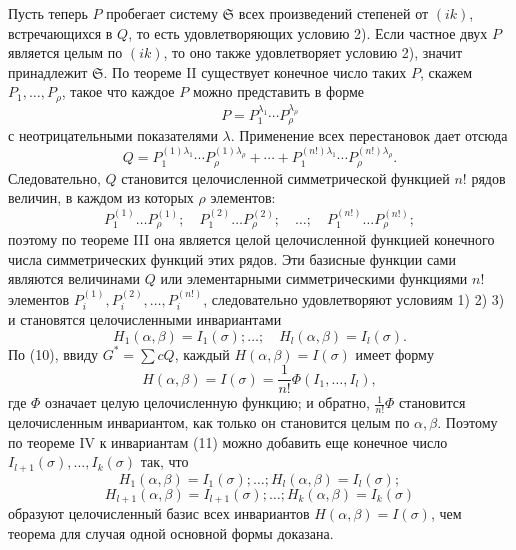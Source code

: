 \documentclass[11pt]{article}
\providecommand{\frS}{\mathfrak S}
\begin{document}
Пусть теперь \(P\) пробегает систему \(\frS\) всех произведений степеней от \((ik)\), встречающихся в \(Q\), то есть удовлетворяющих условию 2). Если частное двух \(P\) является целым по \((ik)\), то оно также удовлетворяет условию 2), значит принадлежит \(\frS\). По теореме II существует конечное число таких \(P\), скажем \(P_1,\ldots,P_\rho\), такое что каждое \(P\) можно представить в форме
\[
        P=P_1^{\lambda_1}\cdots P_\rho^{\lambda_\rho}
\]
с неотрицательными показателями \(\lambda\). Применение всех перестановок дает отсюда
\[
        Q=
        P_1^{(1)\lambda_1}\cdots P_\rho^{(1)\lambda_\rho}
        +\cdots+
        P_1^{(n!)\lambda_1}\cdots P_\rho^{(n!)\lambda_\rho}.
\]
Следовательно, \(Q\) становится целочисленной симметрической функцией \(n!\) рядов величин, в каждом из которых \(\rho\) элементов:
\[
        P_1^{(1)}\ldots P_\rho^{(1)};
        \quad
        P_1^{(2)}\ldots P_\rho^{(2)};
        \quad \ldots;\quad
        P_1^{(n!)}\ldots P_\rho^{(n!)};
\]
поэтому по теореме III она является целой целочисленной функцией конечного числа симметрических функций этих рядов. Эти базисные функции сами являются величинами \(Q\) или элементарными симметрическими функциями \(n!\) элементов \(P_i^{(1)},P_i^{(2)},\ldots,P_i^{(n!)}\), следовательно удовлетворяют условиям 1) 2) 3) и становятся целочисленными инвариантами
\begin{equation}
        H_1(\alpha,\beta)=I_1(\sigma);\ldots;\quad
        H_l(\alpha,\beta)=I_l(\sigma).
\end{equation}
По (10), ввиду \(G^*=\sum cQ\), каждый \(H(\alpha,\beta)=I(\sigma)\) имеет форму
\[
        H(\alpha,\beta)=I(\sigma)=\frac1{n!}\Phi(I_1,\ldots,I_l),
\]
где \(\Phi\) означает целую целочисленную функцию; и обратно, \(\frac1{n!}\Phi\) становится целочисленным инвариантом, как только он становится целым по \(\alpha,\beta\). Поэтому по теореме IV к инвариантам (11) можно добавить еще конечное число \(I_{l+1}(\sigma),\ldots,I_k(\sigma)\) так, что
\[
        H_1(\alpha,\beta)=I_1(\sigma);\ldots;H_l(\alpha,\beta)=I_l(\sigma);
\]
\[
        H_{l+1}(\alpha,\beta)=I_{l+1}(\sigma);\ldots;H_k(\alpha,\beta)=I_k(\sigma)
\]
образуют целочисленный базис всех инвариантов \(H(\alpha,\beta)=I(\sigma)\), чем теорема для случая одной основной формы доказана.
\end{document}
